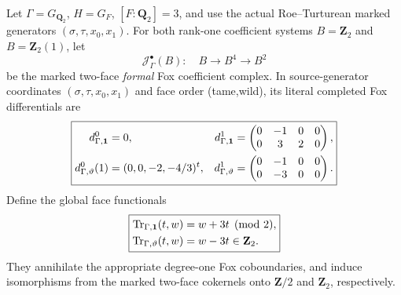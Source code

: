 \begin{theorem}
\label{thm:dyadic-f134-top-transfer-three}
Let $\Gamma=G_{\mathbf Q_2}$,
$H=G_F$,
$[F:\mathbf Q_2]=3$,
and use the actual
Roe--Turturean marked
generators
$(\sigma,\tau,x_0,x_1)$.
For both rank-one
coefficient systems
$B=\mathbf Z_2$
and $B=\mathbf Z_2(1)$,
let
\[
\mathcal J_\Gamma^\bullet(B):
\quad B\to B^4\to B^2
\]
be the marked
two-face \emph{formal}
Fox coefficient
complex.
In source-generator
coordinates
$(\sigma,\tau,x_0,x_1)$
and face order
(tame,wild),
its literal
completed Fox
differentials are
\begin{equation}\label{eq:dyadic-f134-full-marked-two-twist-rows}
\boxed{
\begin{aligned}
d_{\Gamma,\bf1}^0&=0,&
d_{\Gamma,\bf1}^1&=
\begin{pmatrix}
0&-1&0&0\\
0&3&2&0
\end{pmatrix},
\\
d_{\Gamma,\vartheta}^0(1)
&=(0,0,-2,-4/3)^t,&
d_{\Gamma,\vartheta}^1&=
\begin{pmatrix}
0&-1&0&0\\
0&-3&0&0
\end{pmatrix}.
\end{aligned}}
\end{equation}
Define the global
face functionals
\begin{equation}\label{eq:dyadic-f134-global-marked-top-readout}
\boxed{
\begin{aligned}
\operatorname{Tr}_{\Gamma,\bf1}(t,w)
&=w+3t\pmod2,\\
\operatorname{Tr}_{\Gamma,\vartheta}(t,w)
&=w-3t\in\mathbf Z_2.
\end{aligned}}
\end{equation}
They annihilate
the appropriate
degree-one
Fox coboundaries,
and induce
isomorphisms from
the marked
two-face cokernels
onto
$\mathbf Z/2$
and
$\mathbf Z_2$,
respectively.


\end{theorem}

